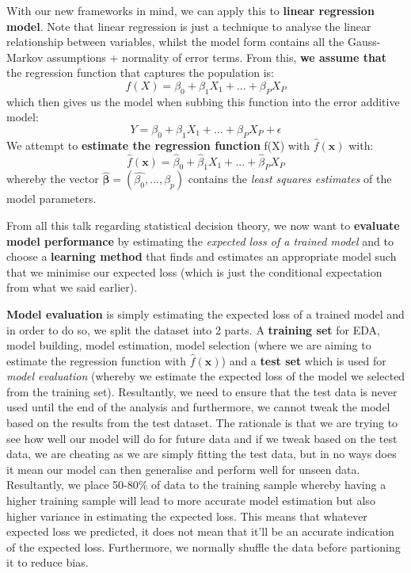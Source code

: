 \documentclass[11pt, oneside]{article}
\theoremstyle{definition}
\begin{document}
With our new frameworks in mind, we can apply this to \textbf{linear regression model}. Note that linear regression is just a technique to analyse the linear relationship between variables, whilst the model form contains all the Gauss-Markov assumptions + normality of error terms. From this, \textbf{we assume that} the regression function that captures the population is:
$$
f(X) = \beta_0 + \beta_1X_1 + ... + \beta_PX_P
$$
which then gives us the model when subbing this function into the error additive model:
$$
Y = \beta_0 + \beta_1X_1 + ... + \beta_PX_P + \epsilon
$$
We attempt to \textbf{estimate the regression function} f(X) with $\hat{f}(\bm{x})$ with:
$$
\hat{f}(\bm{x}) = \hat{\beta}_0 + \hat{\beta}_1X_1 + ... + \hat{\beta}_PX_P
$$
whereby the vector $\bm{\hat{\beta}} = (\hat{\beta_0},...,\hat{\beta_p})$ contains the \textit{least squares estimates} of the model parameters.

From all this talk regarding statistical decision theory, we now want to \textbf{evaluate model performance} by estimating the \textit{expected loss of a trained model} and to choose a \textbf{learning method} that finds and estimates an appropriate model such that we minimise our expected loss (which is just the conditional expectation from what we said earlier).

\textbf{Model evaluation} is simply estimating the expected loss of a trained model and in order to do so, we split the dataset into 2 parts. A \textbf{training set} for EDA, model building, model estimation, model selection (where we are aiming to estimate the regression function with $\hat{f}(\bm{x})$) and a \textbf{test set} which is used for \textit{model evaluation} (whereby we estimate the expected loss of the model we selected from the training set). Resultantly, we need to ensure that the test data is never used until the end of the analysis and furthermore, we cannot tweak the model based on the results from the test dataset. The rationale is that we are trying to see how well our model will do for future data and if we tweak based on the test data, we are cheating as we are simply fitting the test data, but in no ways does it mean our model can then generalise and perform well for unseen data. Resultantly, we place 50-80\% of data to the training sample whereby having a higher training sample will lead to more accurate model estimation but also higher variance in estimating the expected loss. This means that whatever expected loss we predicted, it does not mean that it'll be an accurate indication of the expected loss. Furthermore, we normally shuffle the data before partioning it to reduce bias.
\end{document}
